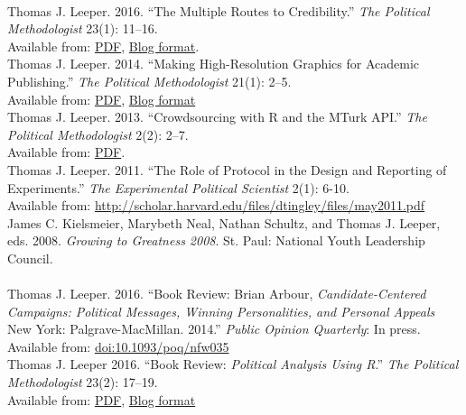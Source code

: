 \documentclass[12pt]{article}
\newcommand{\topic}[1]{\pagebreak[3]\indent {\color{lg}{\footnotesize #1 }}\\}
\newcommand{\entry}[1]{\indent {\color{lg}\guillemotright}\hspace{2pt}#1\vspace{.25em}\\}
\begin{document}
\topic{Other Academic Publications}
    \entry{Thomas J. Leeper. 2016. ``The Multiple Routes to Credibility.'' \textit{The Political Methodologist} 23(1): 11--16.\\ Available from: \href{https://thepoliticalmethodologist.files.wordpress.com/2016/02/tpm_v23_n1.pdf}{PDF}, \href{https://thepoliticalmethodologist.com/2015/12/21/the-multiple-routes-to-credibility/}{Blog format}.}
	\entry{Thomas J. Leeper. 2014. ``Making High-Resolution Graphics for Academic Publishing.'' \textit{The Political Methodologist} 21(1): 2--5.\\ Available from: \href{https://thepoliticalmethodologist.files.wordpress.com/2014/06/tpm_v21_n12.pdf}{PDF}, \href{https://thepoliticalmethodologist.com/2013/11/25/making-high-resolution-graphics-for-academic-publishing/}{Blog format}}
	\entry{Thomas J. Leeper. 2013. ``Crowdsourcing with R and the MTurk API.'' \textit{The Political Methodologist} 2(2): 2--7.\\ Available from: \href{https://thepoliticalmethodologist.files.wordpress.com/2013/09/tpm_v20_n21.pdf}{PDF}.}
	\entry{Thomas J. Leeper. 2011. ``The Role of Protocol in the Design and Reporting of Experiments.'' \textit{The Experimental Political Scientist} 2(1): 6-10.\\ Available from: \url{http://scholar.harvard.edu/files/dtingley/files/may2011.pdf}}
	\entry{James C. Kielsmeier, Marybeth Neal, Nathan Schultz, and Thomas J. Leeper, eds. 2008. \textit{Growing to Greatness 2008}. St. Paul: National Youth Leadership Council.}

\topic{Book Reviews}
	\entry{Thomas J. Leeper. 2016. ``Book Review: Brian Arbour, \textit{Candidate-Centered Campaigns: Political Messages, Winning Personalities, and Personal Appeals} New York: Palgrave-MacMillan. 2014.'' \textit{Public Opinion Quarterly}: In press. Available from: \href{http://doi.org/10.1093/poq/nfw035}{doi:10.1093/poq/nfw035}}
	\entry{Thomas J. Leeper 2016. ``Book Review: \textit{Political Analysis Using R}.'' \textit{The Political Methodologist} 23(2): 17--19.\\ Available from: \href{https://thepoliticalmethodologist.files.wordpress.com/2016/08/tpm_v23_n2.pdf}{PDF}, \href{https://thepoliticalmethodologist.com/2016/05/25/book-review-political-analysis-using-r/}{Blog format}}
\end{document}
